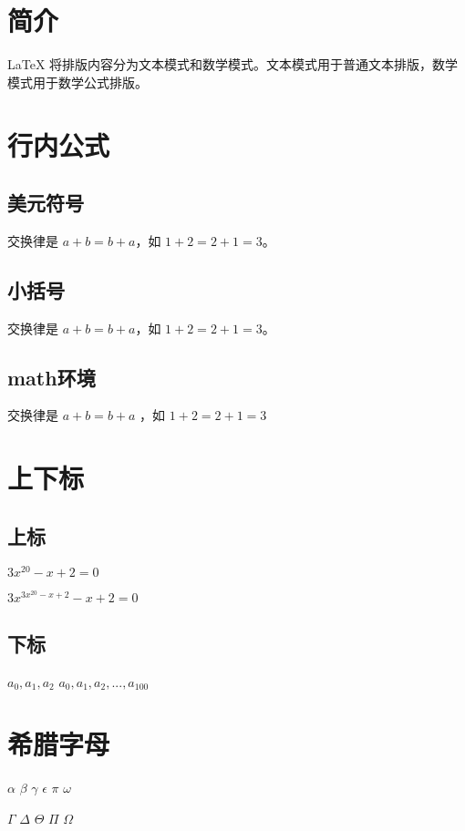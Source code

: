 \documentclass{article}
\begin{document}
    \section{简介}
    \LaTeX{} 将排版内容分为文本模式和数学模式。文本模式用于普通文本排版，数学模式用于数学公式排版。
    \section{行内公式}
    \subsection{美元符号}
    交换律是 $a+b=b+a$，如 $1+2=2+1=3$。

    \subsection{小括号}
    交换律是 \(a+b=b+a\)，如 \(1+2=2+1=3\)。

    \subsection{math环境}
    交换律是
    \begin{math}
        a+b=b+a
    \end{math}
    ，如
    \begin{math}
        1+2=2+1=3
    \end{math}

    \section{上下标}
    \subsection{上标}
    $3x^{20}-x+2=0$

    $3x^{3x^{20}-x+2}-x+2=0$

    \subsection{下标}
    $a_0, a_1, a_2$
    $a_0, a_1, a_2, ..., a_{100}$

    \section{希腊字母}
    $\alpha$
    $\beta$
    $\gamma$
    $\epsilon$
    $\pi$
    $\omega$

    $\Gamma$
    $\Delta$
    $\Theta$
    $\Pi$
    $\Omega$
\end{document}
